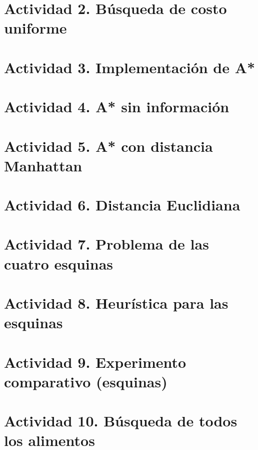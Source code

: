 \documentclass[12pt,a4paper]{article}
\begin{document}
\section{Actividad 2. Búsqueda de costo uniforme}


\section{Actividad 3. Implementación de A*}


\section{Actividad 4. A* sin información}


\section{Actividad 5. A* con distancia Manhattan}


\section{Actividad 6. Distancia Euclidiana}


\section{Actividad 7. Problema de las cuatro esquinas}


\section{Actividad 8. Heurística para las esquinas}


\section{Actividad 9. Experimento comparativo (esquinas)}


\section{Actividad 10. Búsqueda de todos los alimentos}

\end{document}
